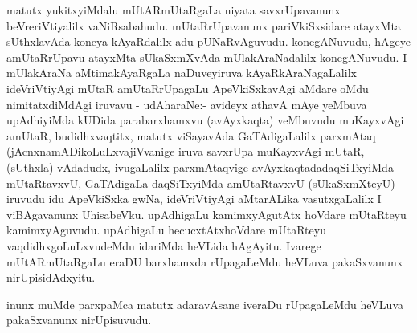 \begin{artha}
matutx yukitxyiMdalu mUtARmUtaRgaLa niyata savxrUpavanunx
\break beVreriVtiyalilx vaNiRsabahudu. mUtaRrUpavanunx pariVkiSxsidare
atayxMta sUthxla\-vAda koneya kAyaRdalilx adu
pUNaRvAguvudu. konegANuvudu, hAgeye amUtaRrUpavu atayxMta sUkaSxmXvAda
mUlakAraNadalilx konegANuvudu. I mUlakAraNa aMtimakAyaRgaLa
naDuveyiruva kAyaRkAraNagaLalilx ideVriVti\-yAgi mUtaR amUtaRrUpagaLu
ApeVkiSxkavAgi aMdare oMdu nimitatxdiMdAgi iruvavu - udAharaNe:-
avideyx athavA mAye yeMbuva upAdhiyiMda kUDida parabarxhamxvu
(avAyxkaqta) veMbuvudu muKayxvAgi amUtaR, budidhx\-vaqtitx, matutx
viSayavAda GaTAdigaLalilx parxmAtaq (jAcnxnamADikoLuLxvajiVvanige iruva
savxrUpa muKayxvAgi mUtaR, (sUthxla) vAdadudx, ivugaLalilx
parxmAtaqvige avAyxkaqta\-dadaqSiTxyiMda mUtaRtavxvU, GaTAdigaLa
daqSiTxyiMda amUtaRtavxvU (sUkaSxmXte\-yU) iruvudu idu ApeVkiSxka gwNa,
ideVriVtiyAgi aMtarALika vasutxgaLalilx I viBAgavanunx
UhisabeVku. upAdhigaLu kamimxyAgutAtx hoVdare mUtaRteyu
kamimxyAguvudu. upAdhigaLu hecucxtAtxhoVdare mUtaRteyu
vaqdidhxgoLuLxvu\-deMdu idariMda heVLida hAgAyitu. Ivarege
mUtARmUtaRgaLu eraDU barxhamxda rUpagaLeMdu heVLuva pakaSxvanunx
nirUpisidAdxyitu.
\end{artha}

\begin{artha}
inunx muMde parxpaMca matutx adaravAsane iveraDu rUpagaLeMdu heVLuva
pakaSxvanunx nirUpisuvudu.
\end{artha}

\centerline{}

